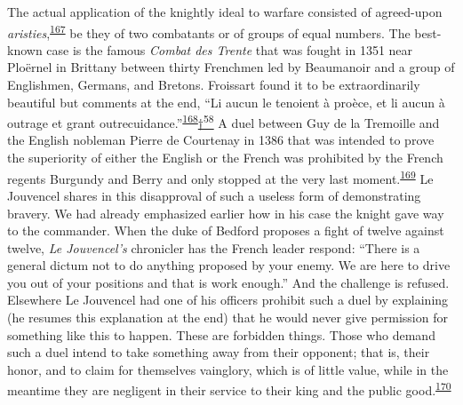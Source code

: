 The actual application of the knightly ideal to warfare consisted of
agreed-upon
\emph{aristies},\textsuperscript{\protect\hypertarget{10_Chapter_Three__THE_HEROIC_DREAM.xhtmlux5cux23id_1602}{\protect\hyperlink{23_NOTES.xhtmlux5cux23id_1603}{167}}}
be they of two combatants or of groups of equal numbers. The best-known
case is the famous \emph{Combat des Trente} that was fought in 1351 near
Ploërnel in Brittany between thirty Frenchmen led by Beaumanoir and a
group of Englishmen, Germans, and Bretons. Froissart found it to be
extraordinarily beautiful but comments at the end, ``Li aucun le
tenoient à proèce, et li aucun à outrage et grant
outrecuidance.''\textsuperscript{\protect\hypertarget{10_Chapter_Three__THE_HEROIC_DREAM.xhtmlux5cux23id_1600}{\protect\hyperlink{23_NOTES.xhtmlux5cux23id_1601}{168}}}\protect\hypertarget{10_Chapter_Three__THE_HEROIC_DREAM.xhtmlux5cux23id_2903}{\protect\hyperlink{23_NOTES.xhtmlux5cux23id_2904}{†\textsuperscript{58}}}
A duel between Guy de la Tremoille and the English nobleman Pierre de
Courtenay in 1386 that was intended to prove the superiority of either
the English or the French was prohibited by the French regents Burgundy
and Berry and only stopped at the very last
moment.\textsuperscript{\protect\hypertarget{10_Chapter_Three__THE_HEROIC_DREAM.xhtmlux5cux23id_1598}{\protect\hyperlink{23_NOTES.xhtmlux5cux23id_1599}{169}}}
Le Jouvencel shares in this disapproval of such a useless form of
demonstrating bravery. We had already emphasized earlier how in his case
the knight gave way to the commander. When the duke of Bedford proposes
a fight of twelve against twelve, \emph{Le Jouvencel's} chronicler has
the French leader respond: ``There is a general dictum not to do
anything proposed by your enemy. We are here to drive you out of your
positions and that is work enough.'' And the challenge is refused.
Elsewhere Le Jouvencel had
\protect\hypertarget{10_Chapter_Three__THE_HEROIC_DREAM.xhtmlux5cux23page_113}{}{}one
of his officers prohibit such a duel by explaining (he resumes this
explanation at the end) that he would never give permission for
something like this to happen. These are forbidden things. Those who
demand such a duel intend to take something away from their opponent;
that is, their honor, and to claim for themselves vainglory, which is of
little value, while in the meantime they are negligent in their service
to their king and the public
good.\textsuperscript{\protect\hypertarget{10_Chapter_Three__THE_HEROIC_DREAM.xhtmlux5cux23id_1596}{\protect\hyperlink{23_NOTES.xhtmlux5cux23id_1597}{170}}}

